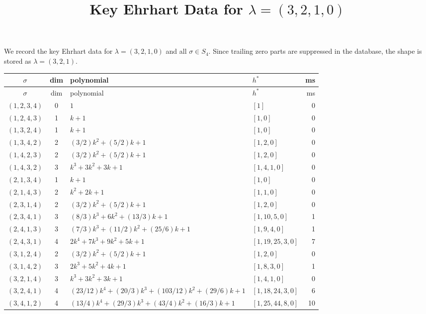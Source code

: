 \documentclass[11pt]{article}
\begin{document}
\title{Key Ehrhart Data for $\lambda=(3,2,1,0)$}
\author{}
\date{}
\maketitle

We record the key Ehrhart data for $\lambda=(3,2,1,0)$ and all
$\sigma \in S_4$. Since trailing zero parts are suppressed in the database,
the shape is stored as $\lambda=(3,2,1)$.

\footnotesize
\begin{longtable}{c c >{\raggedright\arraybackslash}p{} >{\raggedright\arraybackslash}p{} r}
\toprule
$\sigma$ & dim & polynomial & $h^*$ & ms \\
\midrule
\endfirsthead
\toprule
$\sigma$ & dim & polynomial & $h^*$ & ms \\
\midrule
\endhead
\bottomrule
\endfoot
$(1,2,3,4)$ & 0 & $1$ & $[1]$ & 0 \\
$(1,2,4,3)$ & 1 & $k + 1$ & $[1,0]$ & 0 \\
$(1,3,2,4)$ & 1 & $k + 1$ & $[1,0]$ & 0 \\
$(1,3,4,2)$ & 2 & $(3/2)k^2 + (5/2)k + 1$ & $[1,2,0]$ & 0 \\
$(1,4,2,3)$ & 2 & $(3/2)k^2 + (5/2)k + 1$ & $[1,2,0]$ & 0 \\
$(1,4,3,2)$ & 3 & $k^3 + 3k^2 + 3k + 1$ & $[1,4,1,0]$ & 0 \\
$(2,1,3,4)$ & 1 & $k + 1$ & $[1,0]$ & 0 \\
$(2,1,4,3)$ & 2 & $k^2 + 2k + 1$ & $[1,1,0]$ & 0 \\
$(2,3,1,4)$ & 2 & $(3/2)k^2 + (5/2)k + 1$ & $[1,2,0]$ & 0 \\
$(2,3,4,1)$ & 3 & $(8/3)k^3 + 6k^2 + (13/3)k + 1$ & $[1,10,5,0]$ & 1 \\
$(2,4,1,3)$ & 3 & $(7/3)k^3 + (11/2)k^2 + (25/6)k + 1$ & $[1,9,4,0]$ & 1 \\
$(2,4,3,1)$ & 4 & $2k^4 + 7k^3 + 9k^2 + 5k + 1$ & $[1,19,25,3,0]$ & 7 \\
$(3,1,2,4)$ & 2 & $(3/2)k^2 + (5/2)k + 1$ & $[1,2,0]$ & 0 \\
$(3,1,4,2)$ & 3 & $2k^3 + 5k^2 + 4k + 1$ & $[1,8,3,0]$ & 1 \\
$(3,2,1,4)$ & 3 & $k^3 + 3k^2 + 3k + 1$ & $[1,4,1,0]$ & 0 \\
$(3,2,4,1)$ & 4 & $(23/12)k^4 + (20/3)k^3 + (103/12)k^2 + (29/6)k + 1$ & $[1,18,24,3,0]$ & 6 \\
$(3,4,1,2)$ & 4 & $(13/4)k^4 + (29/3)k^3 + (43/4)k^2 + (16/3)k + 1$ & $[1,25,44,8,0]$ & 10 \\

\end{longtable}
\end{document}
